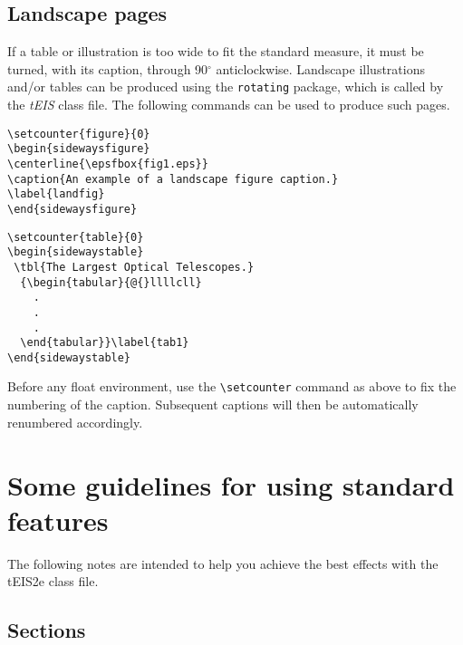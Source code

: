 \documentclass[]{tEIS2e}
\theoremstyle{plain}
\theoremstyle{remark}
\begin{document}
\subsection{Landscape pages}\label{eps}

If a table or illustration is too wide to fit the standard measure, it must be turned, with its caption,
through 90$^{\circ}$ anticlockwise. Landscape illustrations and/or tables can be produced using
the \verb"rotating" package, which is called by the \textit{tEIS} class file. The following commands can
be used to produce such pages.
%
\begin{verbatim}
\setcounter{figure}{0}
\begin{sidewaysfigure}
\centerline{\epsfbox{fig1.eps}}
\caption{An example of a landscape figure caption.}
\label{landfig}
\end{sidewaysfigure}
\end{verbatim}

\begin{verbatim}
\setcounter{table}{0}
\begin{sidewaystable}
 \tbl{The Largest Optical Telescopes.}
  {\begin{tabular}{@{}llllcll}
    .
    .
    .
  \end{tabular}}\label{tab1}
\end{sidewaystable}
\end{verbatim}
%
Before any float environment, use the \verb"\setcounter" command
as above to fix the numbering of the caption. Subsequent captions
will then be automatically renumbered accordingly.


\section[]{Some guidelines for using standard features}

The following notes are intended to help you achieve the best effects with the tEIS2e class file.


\subsection{Sections}
\end{document}
